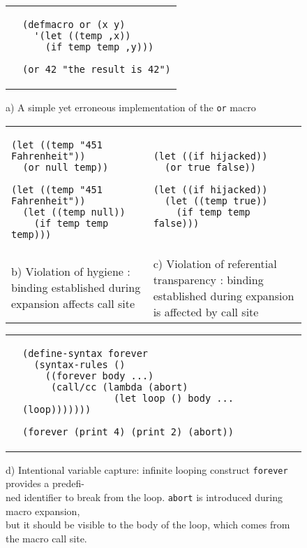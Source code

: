 \documentclass[10pt,journal,a4paper]{IEEEtran}
\begin{document}
\begin{figure*}[t]
\begin{listing}
\normalsize

\begin{tabular}{p{5.4cm} p{15cm}}\\
 &
\begin{verbatim}
(defmacro or (x y)
  '(let ((temp ,x))
    (if temp temp ,y)))

(or 42 "the result is 42")
\end{verbatim}
\end{tabular}

\begin{center}
a) A simple yet erroneous implementation of the \texttt{or} macro
\end{center}

\begin{tabular}{p{8.5cm} p{8.5cm}}\\
\begin{verbatim}
(let ((temp "451 Fahrenheit"))
  (or null temp))

(let ((temp "451 Fahrenheit"))
  (let ((temp null))
    (if temp temp temp)))
\end{verbatim}
&
\begin{verbatim}
(let ((if hijacked))
  (or true false))

(let ((if hijacked))
  (let ((temp true))
    (if temp temp false)))
\end{verbatim}\\
b) Violation of hygiene \cite{kohlbecker86}: binding established during expansion
affects call site
&
c) Violation of referential transparency \cite{dybvig92}: binding established during expansion
is affected by call site
\end{tabular}

\begin{tabular}{p{2.8cm} p{15cm}}\\
 &
\begin{verbatim}
(define-syntax forever
  (syntax-rules ()
    ((forever body ...)
     (call/cc (lambda (abort)
                (let loop () body ... (loop)))))))

(forever (print 4) (print 2) (abort))
\end{verbatim}
\end{tabular}

\begin{adjustwidth}{2.5cm}{0pt}
d) Intentional variable capture: infinite looping construct \texttt{forever} provides
a predefi-\\ned identifier to break from the loop. \texttt{abort} is introduced during
macro expansion,\\ but it should be visible to the body of the loop, which
comes from the macro call site.
\end{adjustwidth}

\end{listing}
\end{figure*}
\end{document}

